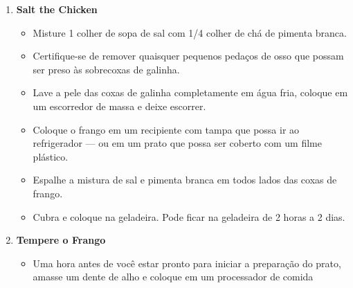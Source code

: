 \documentclass [11pt, letterpaper] {article}
\begin{document}
\begin {description}
\begin {enumerate}
\begin {itemize}
\item Pre-aqueça o forno para 125 C.
\item Coloque amendoim cru em uma forma e coloque o forno.
\item Após 20 minutos, comece a monitorar os amendoins a cada 5
minutos ou mais.
\item Os amendoins podem levar até 45 minutos para torrar a esta temperatura,
mas uma vez que chegam ao ponto, irão passar de
perfeitamente torrados para um sabor amargo muito rapidamente.
\item Os amendoins estarão prontos quando são muito cheirosos e levemente dourados.
\item Remova os amendoins do forno e deixe esfriar completamente.
\item Processe amendoim no processador de alimentos até formar uma
bola de uma pasta muito suave. Você pode ter que raspar os lados de
o processador de alimentos de tempos em tempos. Pode levar de tres a quatro
minutos de processamento dependendo do processador.
\item Se você não está pronto para prosseguir, coloque a pasta de amendoim
um saco de ziplock limpo e congele
\end {itemize}
\item {\bf Salt the Chicken}
\begin {itemize}
\item Misture 1 colher de sopa de sal com 1/4 colher de chá de pimenta branca.
\item Certifique-se de remover quaisquer pequenos pedaços de osso que possam ser
preso às sobrecoxas de galinha.
\item Lave a pele das coxas de galinha completamente em água fria,
coloque em um escorredor de massa e deixe escorrer.
\item Coloque o frango em um recipiente com tampa que possa ir ao
refrigerador --- ou em um prato que possa ser coberto com um filme pl\'astico.
\item Espalhe a mistura de sal e pimenta branca em todos
lados das coxas de frango.
\item Cubra e coloque na geladeira. Pode ficar na geladeira
de 2 horas a 2 dias.
\end {itemize}
\item {\bf Tempere o Frango}
\begin {itemize}
\item Uma hora antes de você estar pronto para iniciar a preparação
do prato, amasse um dente de alho e coloque em um processador de comida

\end{itemize}
\end{enumerate}
\end{description}
\end{document}
